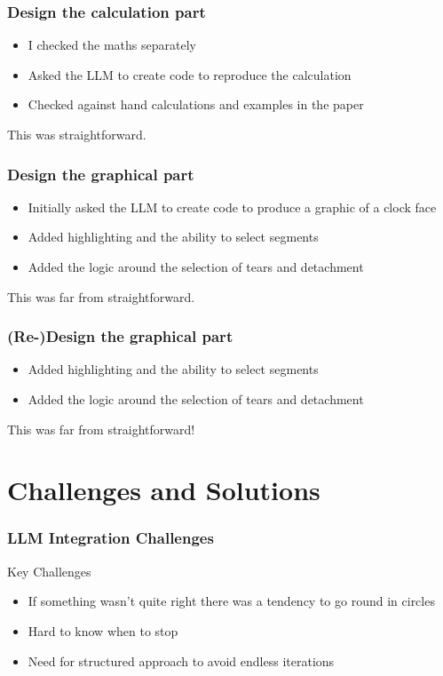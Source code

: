 \documentclass{beamer}
\begin{document}
\begin{frame}
    \frametitle{Design the calculation part}
    \begin{itemize}
        \item I checked the maths separately
        \item Asked the LLM to create code to reproduce the calculation
        \item Checked against hand calculations and examples in the paper
    \end{itemize}

    \vspace{0.5cm}
    This was straightforward.
\end{frame}

\begin{frame}
    \frametitle{Design the graphical part}
    \begin{itemize}
        \item Initially asked the LLM to create code to produce a graphic of a clock face
        \item Added highlighting and the ability to select segments
        \item Added the logic around the selection of tears and detachment
    \end{itemize}
    
    \vspace{0.5cm}
    This was far from straightforward.
\end{frame}

\begin{frame}
    \frametitle{(Re-)Design the graphical part}
    \begin{itemize}
        \item Added highlighting and the ability to select segments
        \item Added the logic around the selection of tears and detachment
    \end{itemize}
    
    \vspace{0.5cm}
    This was far from straightforward!
\end{frame}

\section{Challenges and Solutions}
\begin{frame}
    \frametitle{LLM Integration Challenges}
    \begin{alertblock}{Key Challenges}
        \begin{itemize}
            \item If something wasn't quite right there was a tendency to go round in circles
            \item Hard to know when to stop
            \item Need for structured approach to avoid endless iterations
        \end{itemize}
    \end{alertblock}
\end{frame}
\end{document}
